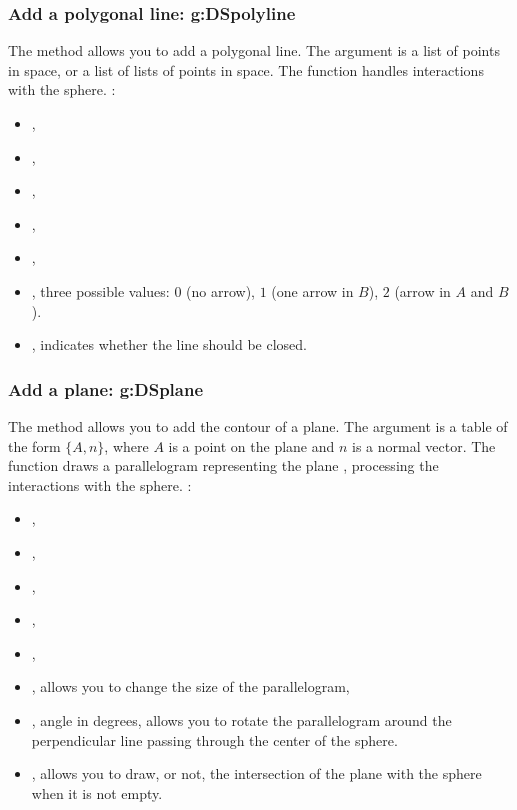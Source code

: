     
\subsubsection{ Add a polygonal line: g:DSpolyline}

The  method allows you to add a polygonal line. The argument  is a list of points in space, or a list of lists of points in space. The function handles interactions with the sphere. \writeoptions:
\begin{itemize}
    \item {},
    \item {},
    \item {},
    \item {},
    \item {},
    \item {}, three possible values: $0$ (no arrow), $1$ (one arrow in $B$), $2$ (arrow in $A$ and $B$).
    \item {}, indicates whether the line should be closed.
\end{itemize}

\subsubsection{Add a plane: g:DSplane}

The  method allows you to add the contour of a plane. The argument  is a table of the form $\{A,n\}$, where $A$ is a point on the plane and $n$ is a normal vector. The function draws a parallelogram representing the plane , processing the interactions with the sphere. \writeoptions:
\begin{itemize}
    \item {},
    \item {},
    \item {},
    \item {},
    \item {},
    \item {}, allows you to change the size of the parallelogram,
    \item {}, angle in degrees, allows you to rotate the parallelogram around the perpendicular line passing through the center of the sphere.
    \item {}, allows you to draw, or not, the intersection of the plane with the sphere when it is not empty.
\end{itemize}

